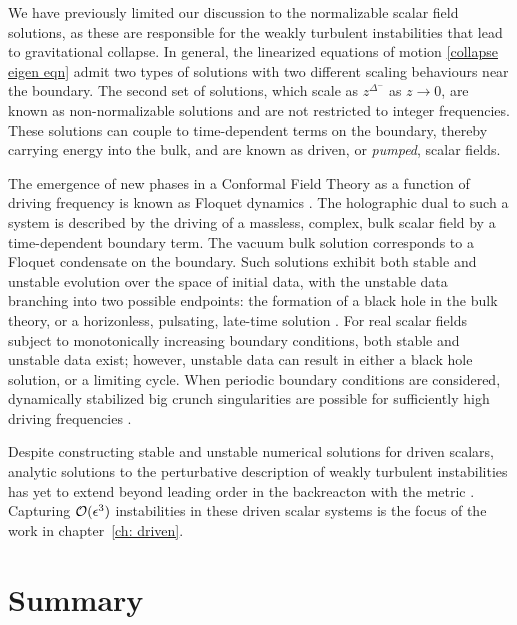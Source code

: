 \documentclass[../PhD.tex]{subfiles}
\begin{document}
We have previously limited our discussion to the normalizable scalar field solutions, as these are responsible for the weakly turbulent instabilities that lead to gravitational collapse. In general, the linearized equations of motion \eqref{collapse eigen eqn} admit two types of solutions with two different scaling behaviours near the boundary. The second set of solutions, which scale as $z^{\Delta^-}$ as $z \to 0$, are known as non-normalizable solutions and are not restricted to integer frequencies. These solutions can couple to time-dependent terms on the boundary, thereby carrying energy into the bulk, and are known as driven, or \emph{pumped}, scalar fields.

The emergence of new phases in a Conformal Field Theory as a function of driving frequency is known as Floquet dynamics \cite{1805.00031, 1802.05285}. The holographic dual to such a system is described by the driving of a massless, complex, bulk scalar field by a time-dependent boundary term. The vacuum bulk solution corresponds to a Floquet condensate on the boundary. Such solutions exhibit both stable and unstable evolution over the space of initial data, with the unstable data branching into two possible endpoints: the formation of a black hole in the bulk theory, or a horizonless, pulsating, late-time solution \cite{1612.07701, 1712.07637}. For real scalar fields subject to monotonically increasing boundary conditions, both stable and unstable data exist; however, unstable data can result in either a black hole solution, or a limiting cycle. When periodic boundary conditions are considered, dynamically stabilized big crunch singularities are possible for sufficiently high driving frequencies \cite{1206.2902}. 

Despite constructing stable and unstable numerical solutions for driven scalars, analytic solutions to the perturbative description of weakly turbulent instabilities has yet to extend beyond leading order in the backreacton with the metric \cite{1308.2132}. Capturing $\mathcal O(\epsilon^3)$ instabilities in these driven scalar systems is the focus of the work in chapter~\ref{ch: driven}. 



\section{Summary}
\label{sec: summary}
\end{document}
